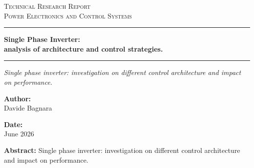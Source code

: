 \documentclass[12pt,a4paper]{scrartcl}
\newcommand{\DocCategory}{Technical Research Report}
\newcommand{\DocField}{Power Electronics and Control Systems}
\newcommand{\DocTitle}{%
	{\fontsize{20}{24}\selectfont\bfseries Single Phase Inverter:} \\[16pt]
	{\fontsize{16}{20}\selectfont\bfseries analysis of architecture and control strategies.}
}
\newcommand{\DocSubtitle}{%
	Single phase inverter: investigation on different control architecture and impact on performance.
}
\newcommand{\DocAuthor}{Davide Bagnara}
\newcommand{\DocDate}{June 2026}
\newcommand{\DocAbstract}{%
	Single phase inverter: investigation on different control architecture and impact on performance.
}
\begin{document}
	\titlepage
	\begin{center}
		{\Large\scshape \DocCategory}\\[8pt]
		{\large\scshape \DocField}
	\end{center}
	
	\vspace{36pt}
	\noindent\rule{\linewidth}{0.8pt}
	
	\vspace{16pt}
	\begin{center}
		\DocTitle
	\end{center}
	
	\vspace{4pt}
	\noindent\rule{\linewidth}{2.2pt}
	
	\begin{center}
		\begin{onehalfspace}
			{\large\itshape \DocSubtitle}
		\end{onehalfspace}
	\end{center}
	
	\vspace{18pt}
	
	\begin{minipage}{0.92\linewidth}
		\noindent
		\begin{minipage}[t]{0.48\linewidth}
			\textbf{Author:}\\[2pt]
			\DocAuthor
		\end{minipage}%
		\hfill
		\begin{minipage}[t]{0.48\linewidth}
			\raggedleft
			\textbf{Date:}\\[2pt]
			\DocDate
		\end{minipage}
	\end{minipage}
	\vspace{36pt}
	
	\begin{center}
		\begin{minipage}{0.85\linewidth}
			\footnotesize 
			\begin{onehalfspace}
				\textbf{Abstract:} \DocAbstract
			\end{onehalfspace}
		\end{minipage}
	\end{center}
	
\end{document}
